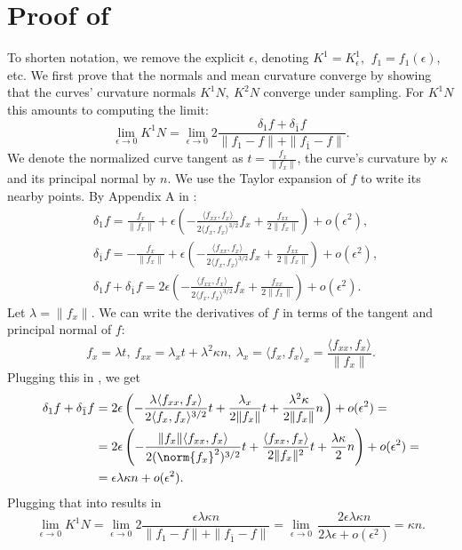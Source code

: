 \section{Proof of } \label{app:mean_normal_laplacian_conv}
To shorten notation, we remove the explicit $\epsilon$, denoting $K^1 = K^1_\epsilon$, $\ f_1=f_1(\epsilon)$, etc.
We first prove that the normals and mean curvature converge by showing that the curves' curvature normals $K^1N,\ K^2N$ converge under sampling. For $K^1N$ this amounts to computing the limit:
\begin{equation} \label{eq:K1N}
\lim_{\epsilon \to 0} K^1N = \lim_{\epsilon \to 0} 2\frac{\delta_1 f + \delta_{\bar1}f}{\|f_1-f\| + \|f_{\bar1}-f\|}.
\end{equation}
We denote the normalized curve tangent as $t=\frac{f_x}{\|f_x\|}$, the curve's curvature by $\kappa$ and its principal normal by $n$. We use the Taylor expansion of $f$ to write its nearby points. By Appendix A in \cite{rabi18}:
\begin{align} 
\nonumber
&\delta_1 f = \frac{f_x}{\|f_x\|} + \epsilon\left(-\frac{\langle f_{xx},f_x \rangle}{2\langle f_x,f_x \rangle^{{3}/{2}}}f_x + \frac{f_{xx}}{2\|f_x\|}\right) + o(\epsilon^2), \\
\nonumber
&\delta_{\bar1} f = -\frac{f_x}{\|f_x\|} + \epsilon\left(-\frac{\langle f_{xx},f_x \rangle}{2\langle f_x,f_x \rangle^{{3}/{2}}}f_x + \frac{f_{xx}}{2\|f_x\|}\right) + o(\epsilon^2), \\
\label{eq:taylor}
&\delta_{1} f + \delta_{\bar1} f = 2\epsilon\left(-\frac{\langle f_{xx},f_x \rangle}{2\langle f_x,f_x \rangle^{{3}/{2}}}f_x + \frac{f_{xx}}{2\|f_x\|}\right) + o(\epsilon^2).
\end{align}
Let $\lambda = \|f_x\|$. We can write the derivatives of $f$ in terms of the tangent and principal normal of $f$:
\begin{equation}
f_x = \lambda t, \ f_{xx} = \lambda_x t +\lambda^2\kappa n, \ \lambda_x = \langle f_x,f_x \rangle _x = \frac{\langle f_{xx},f_x\rangle}{\|f_x\|}.
\end{equation}
Plugging this in , we get
\begin{equation*}
\begin{split}
\delta_{1} f + \delta_{\bar1} f &= 2\epsilon\left(-\frac{\lambda \langle f_{xx},f_x \rangle}{2\langle f_x,f_x \rangle^{{3}/{2}}}t + \frac{\lambda_x}{2\|f_x\|}t + \frac{\lambda^2\kappa}{2\|f_x\|}n\right) + o(\epsilon^2) = \\
&= 2\epsilon\left(-\frac{\|f_x\|\langle f_{xx},f_x \rangle}{2(\norm{f_x}^2)^{{3}/{2}}}t + \frac{\langle f_{xx},f_x\rangle}{2\|f_x\|^2}t + \frac{\lambda \kappa}{2}n\right) + o(\epsilon^2) = \\
&=\epsilon \lambda \kappa n + o(\epsilon^2).
\end{split}
\end{equation*}
Plugging that into  results in
\begin{equation*} 
\lim_{\epsilon \to 0} K^1N = \lim_{\epsilon \to 0} 2\frac{\epsilon\lambda \kappa n}{\|f_1-f\| + \|f_{\bar1}-f\|} = \lim_{\epsilon \to 0} \,\frac{2\epsilon\lambda \kappa n}{2\lambda\epsilon + o(\epsilon^2)} = \kappa n.
\end{equation*}

